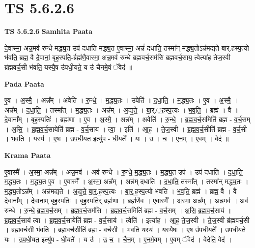 \documentclass[17pt]{extarticle}
\begin{document}
\section{ TS 5.6.2.6 }

\textbf{TS 5.6.2.6 } \newline
\textbf{Samhita Paata} \newline

दे॒वास्मा॒ अन्न॒मव॑ रुन्धे मद्ध्य॒त उप॑ दधाति मद्ध्य॒त ए॒वास्मा॒ अन्नं॑ दधाति॒ तस्मा᳚न् मद्ध्य॒तोऽन्न॑मद्यते बार्.हस्प॒त्यो भ॑वति॒ ब्रह्म॒ वै दे॒वानां॒ बृह॒स्पति॒-र्ब्रह्म॑णै॒वास्मा॒ अन्न॒मव॑ रुन्धे ब्रह्मवर्च॒सम॑सि ब्रह्मवर्च॒साय॒ त्वेत्या॑ह तेज॒स्वी ब्र॑ह्मवर्च॒सी भ॑वति॒ यस्यै॒ष उ॑पधी॒यते॒ य उ॑ चैनमे॒वं ॅवेद॑ ॥ \newline

\textbf{Pada Paata} \newline

ए॒व । अ॒स्मै॒ । अन्न᳚म् । अवेति॑ । रु॒न्धे॒ । म॒द्ध्य॒तः । उपेति॑ । द॒धा॒ति॒ । म॒द्ध्य॒तः । ए॒व । अ॒स्मै॒ । अन्न᳚म् । द॒धा॒ति॒ । तस्मा᳚त् । म॒द्ध्य॒तः । अन्न᳚म् । अ॒द्य॒ते॒ । बा॒र्.॒ह॒स्प॒त्यः । भ॒व॒ति॒ । ब्रह्म॑ । वै । दे॒वाना᳚म् । बृह॒स्पतिः॑ । ब्रह्म॑णा । ए॒व । अ॒स्मै॒ । अन्न᳚म् । अवेति॑ ।       रु॒न्धे॒ । ब्र॒ह्म॒व॒र्च॒समिति॑ ब्रह्म - व॒र्च॒सम् । अ॒सि॒ । ब्र॒ह्म॒व॒र्च॒सायेति॑ ब्रह्म - व॒र्च॒साय॑ । त्वा॒ । इति॑ । आ॒ह॒ । ते॒ज॒स्वी । ब्र॒ह्म॒व॒र्च॒सीति॑ ब्रह्म - व॒र्च॒सी । भ॒व॒ति॒ । यस्य॑ । ए॒षः । उ॒प॒धी॒यत॒ इत्यु॑प - धी॒यते᳚ । यः । उ॒ । च॒ । ए॒न॒म् । ए॒वम् । वेद॑ ॥  \newline


\textbf{Krama Paata} \newline

ए॒वास्मै᳚ । अ॒स्मा॒ अन्न᳚म् । अन्न॒मव॑ । अव॑ रुन्धे । रु॒न्धे॒ म॒द्ध्य॒तः । म॒द्ध्य॒त उप॑ । उप॑ दधाति । द॒धा॒ति॒ म॒द्ध्य॒तः । म॒द्ध्य॒त ए॒व । ए॒वास्मै᳚ । अ॒स्मा॒ अन्न᳚म् । अन्न॑म् दधाति । द॒धा॒ति॒ तस्मा᳚त् । तस्मा᳚न् मद्ध्य॒तः । म॒द्ध्य॒तोऽन्न᳚म् । अन्न॑मद्यते । अ॒द्य॒ते॒ बा॒र्॒.ह॒स्प॒त्यः । बा॒र्॒.ह॒स्प॒त्यो भ॑वति । भ॒व॒ति॒ ब्रह्म॑ । ब्रह्म॒ वै । वै दे॒वाना᳚म् । दे॒वाना॒म् बृह॒स्पतिः॑ । बृह॒स्पति॒र् ब्रह्म॑णा । ब्रह्म॑णै॒व । ए॒वास्मै᳚ । अ॒स्मा॒ अन्न᳚म् । अन्न॒मव॑ । अव॑ रुन्धे । रु॒न्धे॒ ब्र॒ह्म॒व॒र्च॒सम् । ब्र॒ह्म॒व॒र्च॒सम॑सि । ब्र॒ह्म॒व॒र्च॒समिति॑ ब्रह्म - व॒र्च॒सम् । अ॒सि॒ ब्र॒ह्म॒व॒र्च॒साय॑ । ब्र॒ह्म॒व॒र्च॒साय॑ त्वा । ब्र॒ह्म॒व॒र्च॒सायेति॑ ब्रह्म - व॒र्च॒साय॑ । त्वेति॑ । इत्या॑ह । आ॒ह॒ ते॒ज॒स्वी । ते॒ज॒स्वी ब्र॑ह्मवर्च॒सी । ब्र॒ह्म॒व॒र्च॒सी भ॑वति । ब्र॒ह्म॒व॒र्च॒सीति॑ ब्रह्म - व॒र्च॒सी । भ॒व॒ति॒ यस्य॑ । यस्यै॒षः । ए॒ष उ॑पधी॒यते᳚ । उ॒प॒धी॒यते॒ यः । उ॒प॒धी॒यत॒ इत्यु॑प - धी॒यते᳚ । य उ॑ । उ॒ च॒ । चै॒न॒म् । ए॒न॒मे॒वम् । ए॒वम् ॅवेद॑ । वेदेति॒ वेद॑ । \newline
\end{document}
